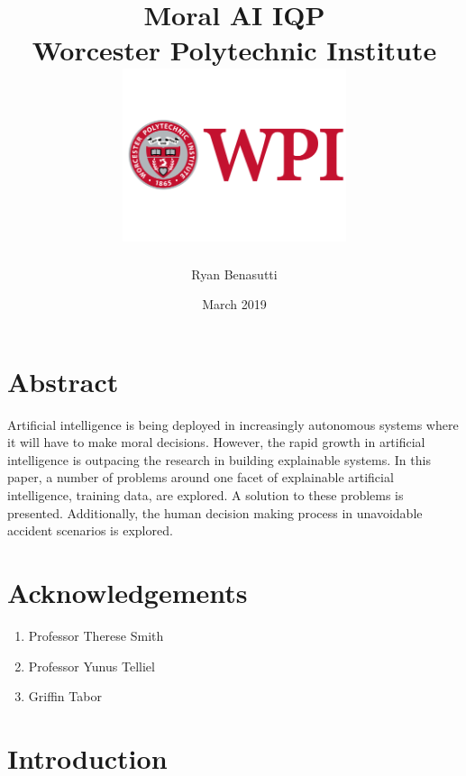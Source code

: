 \documentclass{report}
\title{
    {Moral AI IQP}\\
    {\large Worcester Polytechnic Institute}\\
    {\includegraphics[height=2in]{figures/WPI_Inst_Prim_FulClr.png}}
}
\author{Ryan Benasutti}
\date{March 2019}
\begin{document}
\maketitle

\clearpage
\mbox{}
\clearpage

\chapter*{Abstract}

Artificial intelligence is being deployed in increasingly autonomous systems where it will have to
make moral decisions. However, the rapid growth in artificial intelligence is outpacing the research
in building explainable systems. In this paper, a number of problems around one facet of explainable
artificial intelligence, training data, are explored. A solution to these problems is presented.
Additionally, the human decision making process in unavoidable accident scenarios is explored.

\chapter*{Acknowledgements}

\begin{enumerate}
    \item Professor Therese Smith
    \item Professor Yunus Telliel
    \item Griffin Tabor
\end{enumerate}

\tableofcontents

\FloatBarrier
\chapter{Introduction}
\end{document}

